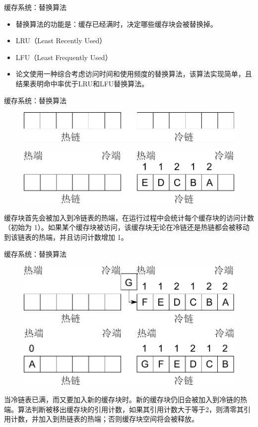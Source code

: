 \documentclass[compress]{beamer}
\begin{document}
\begin{frame}{缓存系统：替换算法}
\begin{itemize}
\item 替换算法的功能是：缓存已经满时，决定哪些缓存块会被替换掉。
\item LRU（Least Recently Used）
\item LFU（Least Frequently Used）
\item 论文使用一种综合考虑访问时间和使用频度的替换算法，该算法实现简单，且结果表明命中率优于LRU和LFU替换算法。
\end{itemize}
\end{frame}

\begin{frame}{缓存系统：替换算法}
\begin{figure}
\includegraphics[width=0.6\linewidth]{../graph/replace-algo-1}
\end{figure}
\begin{figure}
\includegraphics[width=0.6\linewidth]{../graph/replace-algo-2}
\end{figure}
缓存块首先会被加入到冷链表的热端，在运行过程中会统计每个缓存块的访问计数（初始为 1）。如果某个缓存块被访问，该缓存块无论在冷链还是热链都会被移动到该链表的热端，并且访问计数增加 1。
\end{frame}

\begin{frame}{缓存系统：替换算法}
\begin{figure}
\includegraphics[width=0.6\linewidth]{../graph/replace-algo-3}
\end{figure}
当冷链表已满，而又要加入新的缓存块时。新的缓存块仍旧会被加入到冷链的热端。算法判断被移出缓存块的引用计数，如果其引用计数大于等于2，则清零其引用计数，并加入到热链表的热端；否则缓存块空间将会被释放。
\end{frame}
\end{document}
